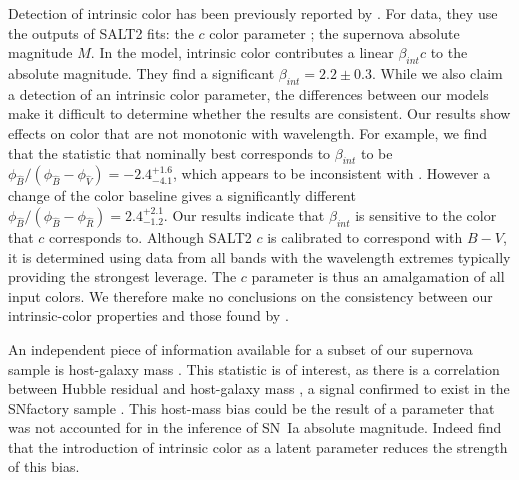 \documentclass[trackchanges]{aastex61}   	%
\begin{document}
{Detection of intrinsic color has been previously reported by .
For data, they use the outputs of SALT2 fits: the $c$ color parameter ;
the
supernova absolute magnitude $M$.
In the 
model, intrinsic color contributes a linear   $\beta_{\mathit{int}} c$ to  the absolute
magnitude.
They find a significant $\beta_{\mathit{int}} = 2.2\pm 0.3$.
While we also claim a detection of an intrinsic color parameter, the differences between our models make it
difficult to determine whether the results are consistent.   Our results show effects on color that are not monotonic
with wavelength.  For example, we find that the statistic that nominally best corresponds to  $\beta_{\mathit{int}}$
to be $\phi_{\hat{B}}/(\phi_{\hat{B}}-\phi_{\hat{V}}) = -2.4_{  -4.1}^{+   1.6}$, which appears to be inconsistent with  .  
However a change of the color baseline gives a significantly different
$\phi_{\hat{B}}/(\phi_{\hat{B}}-\phi_{\hat{R}}) =2.4_{  -1.2}^{+   2.1}$.  Our results indicate that  $\beta_{\mathit{int}}$ %
is sensitive to the color that $c$ corresponds to.  Although SALT2 $c$ is calibrated to correspond with $B-V$, it is
determined using data from all bands with the wavelength extremes  typically providing the strongest leverage.
The $c$ parameter is thus an  amalgamation of all input colors.
We therefore make no conclusions on the consistency between our intrinsic-color properties
and those found by .


An independent piece of information available for a subset of our supernova sample is host-galaxy mass \citep{2013ApJ...770..108C}.  
This statistic is of interest, as there is a correlation between Hubble residual and host-galaxy mass
\citep[first noted by][]{2010ApJ...715..743K,2010MNRAS.406..782S}, a signal confirmed to exist in the SNfactory
sample \citep{2013ApJ...770..108C}.
This host-mass bias could be the result of a parameter that was not accounted for in the inference of SN~Ia absolute magnitude.
Indeed   find that the  introduction of intrinsic color as a latent parameter
reduces the strength of  this bias.

}
\end{document}
